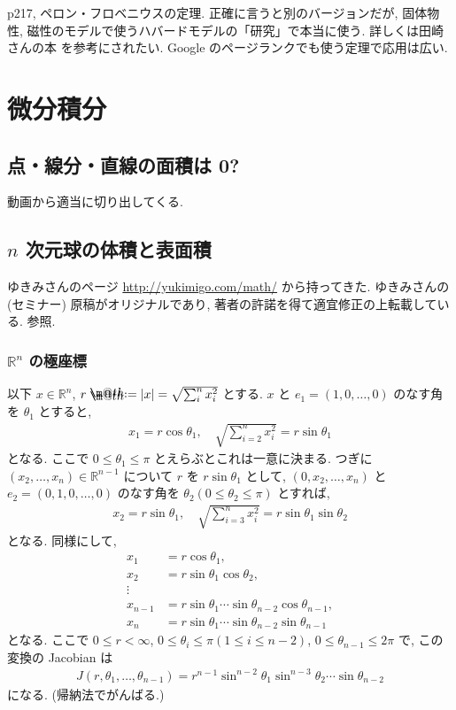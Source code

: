 \documentclass[openany, a4paper, oneside]{jsbook}
\makeatletter
\newcommand*{\defeq}{\mathrel{\rlap{%
\raisebox{0.3ex}{$\m@th\cdot$}}%
\raisebox{-0.3ex}{$\m@th\cdot$}}%
=}
\theoremstyle{break}
\theoremstyle{breakdefn}
\newcommand{\abs}[1]{\left|#1\right|}
\newcommand{\bbR}{\mathbb{R}}
\newcommand{\bbRn}{\mathbb{R}^n}
\makeatother
\begin{document}
p217, ペロン・フロベニウスの定理.
正確に言うと別のバージョンだが, 固体物性, 磁性のモデルで使うハバードモデルの「研究」で本当に使う.
詳しくは田崎さんの本 \cite{HalTasaki6} を参考にされたい.
Google のページランクでも使う定理で応用は広い.
\part{微分積分}

\chapter{点・線分・直線の面積は 0?}


動画から適当に切り出してくる.
\chapter{$n$ 次元球の体積と表面積\label{calculus-n-sphere-volume-surface-area0}}


ゆきみさんのページ \href{http://yukimigo.com/math/}{http://yukimigo.com/math/} から持ってきた.
ゆきみさんの (セミナー) 原稿がオリジナルであり, 著者の許諾を得て適宜修正の上転載している.
\cite{MitsuoSugiura1, MitsuoSugiura2} 参照.
\section{$\bbRn$ の極座標}


以下 $x \in \bbRn$, $r \defeq \abs{x} = \sqrt{\sum_i^n x_i^2}$ とする.
$x$ と $e_1 = (1, 0, \dots, 0)$ のなす角を $\theta_1$ とすると,
\begin{align}
 x_1
 =
 r \cos \theta_1, \quad
 \sqrt{\sum_{i=2}^n x_i^2}
 =
 r \sin \theta_1
\end{align}
となる.
ここで $0 \le \theta_1 \le \pi$ とえらぶとこれは一意に決まる.
つぎに $(x_2, \dots , x_n) \in \bbR^{n-1}$ について
$r$ を $r \sin \theta_1$ として, $(0, x_2, \dots, x_n)$ と
$e_2 = (0, 1, 0, \dots, 0)$ のなす角を $\theta_2 (0 \le \theta_2 \le \pi)$ とすれば,
\begin{align}
 x_2
 =
 r \sin \theta_1, \quad
 \sqrt{\sum_{i=3}^n x_i^2}
 =
 r\sin \theta_1 \sin \theta_2
\end{align}
となる.
同様にして,
\begin{align}
 x_1
 &=
 r\cos \theta_1, \\
 x_2
 &=
 r\sin \theta_1\cos \theta_2, \\
 \vdots \\
 x_{n-1}
 &=
 r\sin \theta_1 \cdots \sin \theta_{n-2} \cos \theta_{n-1}, \\
 x_n
 &=
 r\sin \theta_1 \cdots \sin \theta_{n-2} \sin \theta_{n-1}
\end{align}
となる.
ここで $0 \le r < \infty$,  $0 \le \theta_i \le \pi (1 \le i \le n-2)$,
$0 \le \theta_{n-1} \le 2\pi$ で, この変換の Jacobian は
\begin{align}
 J(r, \theta_1, \dots, \theta_{n-1})
 =
 r^{n-1} \sin^{n-2} \theta_1 \sin^{n-3}\theta_2 \cdots \sin \theta_{n-2}
\end{align}
になる. (帰納法でがんばる.)
\end{document}
